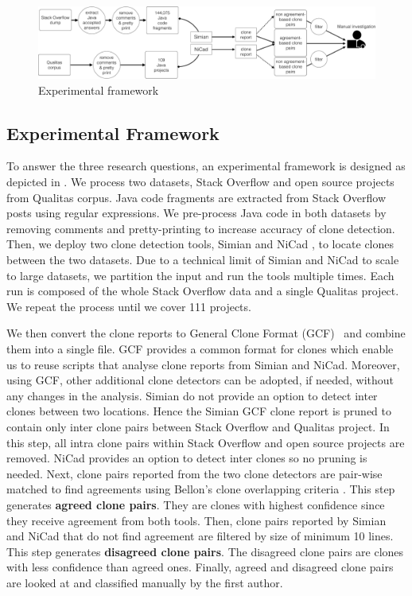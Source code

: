 \documentclass{sig-alternate-05-2015}
\begin{document}
\begin{figure}
	\centering
	\includegraphics[width=0.9\linewidth]{exp_framework}
	\caption{Experimental framework}
	\label{fig:exp_framework}
\end{figure}

\subsection{Experimental Framework}
To answer the three research questions, an experimental framework is designed as depicted in . We process two datasets, Stack Overflow and open source projects from Qualitas corpus. Java code fragments are extracted from Stack Overflow posts using regular expressions. We pre-process Java code in both datasets by removing comments and pretty-printing to increase accuracy of clone detection. Then, we deploy two clone detection tools, Simian \cite{simian} and NiCad \cite{Roy2008,Cordy}, to locate clones between the two datasets. Due to a technical limit of Simian and NiCad to scale to large datasets, we partition the input and run the tools multiple times. Each run is composed of the whole Stack Overflow data and a single Qualitas project. We repeat the process until we cover 111 projects. 

We then convert the clone reports to General Clone Format (GCF)~\cite{Wang2013} and combine them into a single file. GCF provides a common format for clones which enable us to reuse scripts that analyse clone reports from Simian and NiCad. Moreover, using GCF, other additional clone detectors can be adopted, if needed, without any changes in the analysis. Simian do not provide an option to detect inter clones between two locations. Hence the Simian GCF clone report is pruned to contain only inter clone pairs between Stack Overflow and Qualitas project. In this step, all intra clone pairs within Stack Overflow and open source projects are removed. NiCad provides an option to detect inter clones so no pruning is needed. Next, clone pairs reported from the two clone detectors are pair-wise matched to find agreements using Bellon's clone overlapping criteria \cite{Bellon2007}. This step generates \textbf{agreed clone pairs}. They are clones with highest confidence since they receive agreement from both tools. Then, clone pairs reported by Simian and NiCad that do not find agreement are filtered by size of minimum 10 lines. This step generates \textbf{disagreed clone pairs}. The disagreed clone pairs are clones with less confidence than agreed ones. Finally, agreed and disagreed clone pairs are looked at and classified manually by the first author.
\end{document}
